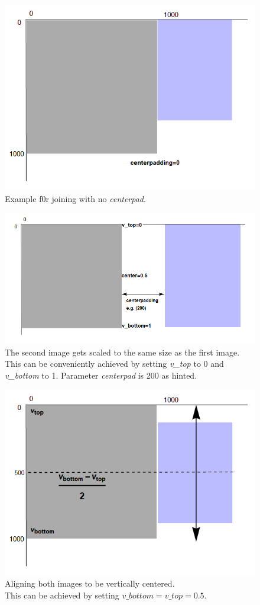 \documentclass[a4paper, 12pt]{scrartcl}
\begin{document}
\begin{figure}[H]
	\centering
	\includegraphics[width=0.6\linewidth]{images/svgjoinpad0.png}
	\caption{Example f0r joining with no \textit{centerpad}.}
	\label{fig:svgjoinpad0}
\end{figure}

\begin{figure}[H]
	\centering
	\includegraphics[width=0.8\linewidth]{images/svgjoinscale1.png}
	\caption{The second image gets scaled to the same size as the first image. This can be conveniently achieved by setting \textit{v\_top} to 0 and \textit{v\_bottom} to 1. Parameter \textit{centerpad} is 200 as hinted.}
	\label{fig:svgjoinscale1}
\end{figure}

\begin{figure}[H]
	\centering
	\includegraphics[width=0.8\linewidth]{images/svgjoinpad0centered.png}
	\caption{Aligning both images to be vertically centered. \\
		This can be achieved by setting $v\_bottom=v\_top=0.5$.}
	\label{fig:svgjoinpad0centered}
\end{figure}
\end{document}
